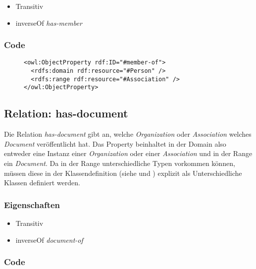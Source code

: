 \documentclass[
    11pt,
    latin1,
    a4paper,
    oneside
]{scrreprt}
\begin{document}
\begin{itemize}
  \item Transitiv
  \item inverseOf \emph{has-member}
\end{itemize}

\subsubsection{Code} \label{sec:rel_memberof_code}

\begin{figure}[h]
 \lstset{language=XML}
 \begin{lstlisting}[label=owl:memberof,caption={Die Relation \emph{member-of} gibt alle \emph{Association} an, bei welcher die Person Mitglied ist}]
<owl:ObjectProperty rdf:ID="#member-of">
  <rdfs:domain rdf:resource="#Person" />
  <rdfs:range rdf:resource="#Association" />
</owl:ObjectProperty>
 \end{lstlisting}
\end{figure}


\subsection{Relation: has-document} \label{sec:rel_hasdocument}

Die Relation \emph{has-document} gibt an, welche \emph{Organization} oder \emph{Association} welches \emph{Document} ver\"offentlicht hat. Das Property beinhaltet in der Domain also entweder eine Instanz einer \emph{Organization} oder einer \emph{Association} und in der Range ein \emph{Document}. Da in der Range unterschiedliche Typen vorkommen k\"onnen, m\"ussen diese in der Klassendefinition (siehe  und ) explizit als Unterschiedliche Klassen definiert werden.

\subsubsection{Eigenschaften} \label{sec:rel_hasdocument_settings}

\begin{itemize}
  \item Transitiv
  \item inverseOf \emph{document-of}
\end{itemize}

\subsubsection{Code} \label{sec:rel_hasdocument_code}
\end{document}
